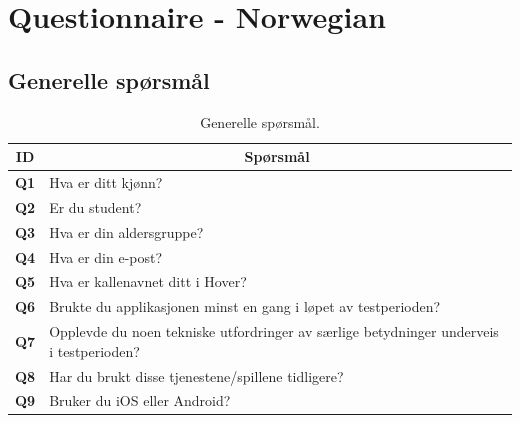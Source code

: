 \section{Questionnaire - Norwegian}
\label{appendix:sporreskjema}

\subsection*{Generelle spørsmål} 
\begin{table}[H]
    \centering
    \begin{tabularx}{\textwidth}{|c|X|}
        \hline
        \textbf{ID} & \multicolumn{1}{c|}{\textbf{Spørsmål}} \\ \hline
        \textbf{Q1} & Hva er ditt kjønn? \\
        \textbf{Q2} & Er du student? \\
        \textbf{Q3} & Hva er din aldersgruppe? \\
        \textbf{Q4} & Hva er din e-post? \\
        \textbf{Q5} & Hva er kallenavnet ditt i Hover? \\
        \textbf{Q6} & Brukte du applikasjonen minst en gang i løpet av testperioden? \\
        \textbf{Q7} & Opplevde du noen tekniske utfordringer av særlige betydninger underveis i testperioden? \\
        \textbf{Q8} & Har du brukt disse tjenestene/spillene tidligere? \\ 
        \textbf{Q9} & Bruker du iOS eller Android?  \\ 
        \hline
    \end{tabularx}
    \caption{Generelle spørsmål.}
    \label{tab:appendix_no_general_questions}
\end{table}

